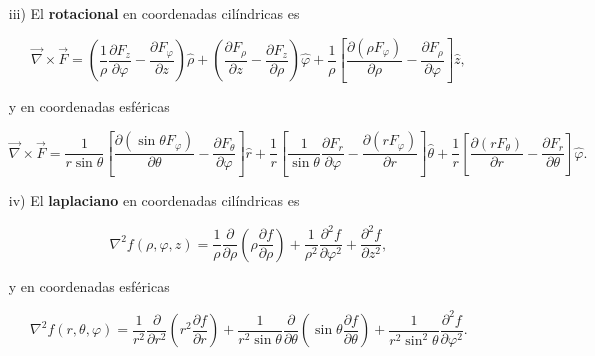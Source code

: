 \begin{itemize}
\item[iii)] El \textbf{rotacional} en coordenadas cilíndricas es
\begin{shaded}
\begin{equation}
\vec{\nabla} \times \vec{F} = \left( \frac{1}{\rho} \frac{\partial F_z}{\partial \varphi} - \frac{\partial F_{\varphi}}{\partial z}\right) \hat{\rho} + \left( \frac{\partial F_{\rho}}{\partial z} - \frac{\partial F_z}{\partial \rho}\right) \hat{\varphi} + \frac{1}{\rho} \left[ \frac{\partial (\rho F_{\varphi})}{\partial \rho} - \frac{\partial F_{\rho}}{\partial \varphi} \right] \hat{z},
\end{equation}
\end{shaded}
y en coordenadas esféricas
\begin{shaded}
\begin{equation}
\vec{\nabla} \times \vec{F} = \frac{1}{r \sin \theta} \left[ \frac{\partial (\sin\theta F_{\varphi})}{\partial \theta} - \frac{\partial F_{\theta}}{\partial \varphi} \right]\hat{r} + \frac{1}{r} \left[ \frac{1}{\sin \theta} \frac{\partial F_r}{\partial \varphi} - \frac{\partial (r F_{\varphi})}{\partial r} \right] \hat{\theta} 
     + \frac{1}{r} \left[ \frac{\partial (rF_{\theta})}{\partial r} - \frac{\partial F_r}{\partial \theta} \right] \hat{\varphi}.
\end{equation}
\end{shaded}

\item[iv)] El \textbf{laplaciano} en coordenadas cilíndricas es
\begin{shaded}
\begin{equation}
\nabla^2 f(\rho, \varphi,z) = \frac{1}{\rho} \frac{\partial}{\partial \rho} \left(\rho \frac{\partial f}{\partial \rho} \right) + \frac{1}{\rho^2} \frac{\partial^2 f}{\partial \varphi^2}  + \frac{\partial^2 f}{\partial z^2},
\end{equation}
\end{shaded}
y en coordenadas esféricas
\begin{shaded}
\begin{equation}
\nabla^2 f(r,\theta,\varphi) = \frac{1}{r^2} \frac{\partial}{\partial r^2} \left( r^2 \frac{\partial f}{\partial r} \right) + \frac{1}{r^2 \sin\theta} \frac{\partial}{\partial \theta} \left( \sin \theta \frac{\partial f}{\partial \theta}\right) + \frac{1}{r^2 \sin^2\theta} \frac{\partial^2 f}{\partial \varphi^2}.
\end{equation}
\end{shaded}
\end{itemize}




